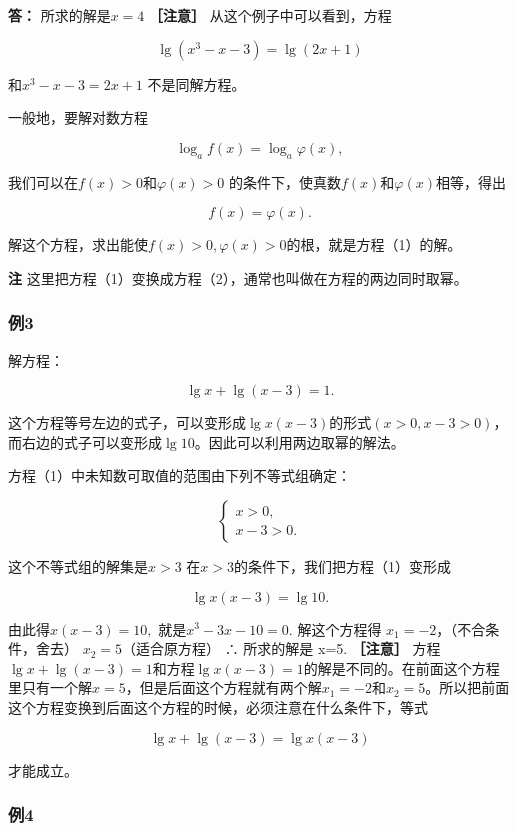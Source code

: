 \textbf{答：} 所求的解是\(x = 4\) \textbf{［注意］}
从这个例子中可以看到，方程

\[
\lg (x^{3} - x - 3) = \lg (2 x + 1)
\]

和\(x^{3} - x - 3 = 2x + 1\) 不是同解方程。

一般地，要解对数方程

\[
\log_{a} f (x) = \log_{a} \varphi (x), \tag {1}
\]

我们可以在\(f(x) > 0\)和\(\varphi (x) > 0\)
的条件下，使真数\(f(x)\)和\(\varphi(x)\)相等，得出

\[
f (x) = \varphi (x). \tag {2}
\]

解这个方程，求出能使\(f(x) > 0, \varphi(x) > 0\)的根，就是方程（1）的解。

\textbf{注}
这里把方程（1）变换成方程（2），通常也叫做在方程的两边同时取幂。

\subsubsection{例3}

解方程：

\[
\lg x + \lg (x - 3) = 1. \tag {1}
\]

这个方程等号左边的式子，可以变形成\(\lg x(x - 3)\)的形式\((x > 0, x - 3 > 0)\)，而右边的式子可以变形成\(\lg 10\)。因此可以利用两边取幂的解法。

 方程（1）中未知数可取值的范围由下列不等式组确定：

\[
\left\{ \begin{array}{l} x > 0, \\ x - 3 > 0. \end{array} \right.
\]

这个不等式组的解集是\(x > 3\) 在\(x > 3\)的条件下，我们把方程（1）变形成

\[
\lg x (x - 3) = \lg 10.
\]

由此得\(x(x - 3) = 10,\) 就是\(x^{3} - 3x - 10 = 0.\) 解这个方程得
\(x_{1} = -2\)，（不合条件，舍去） \(x_{2} = 5\)（适合原方程） ∴
所求的解是 x=5. \textbf{［注意］}
方程\(\lg x + \lg (x - 3) = 1\)和方程\(\lg x(x - 3) = 1\)的解是不同的。在前面这个方程里只有一个解\(x = 5\)，但是后面这个方程就有两个解\(x_{1} = -2\)和\(x_{2} = 5\)。所以把前面这个方程变换到后面这个方程的时候，必须注意在什么条件下，等式

\[
\lg x + \lg (x - 3) = \lg x (x - 3)
\]

才能成立。

\subsubsection{例4}

